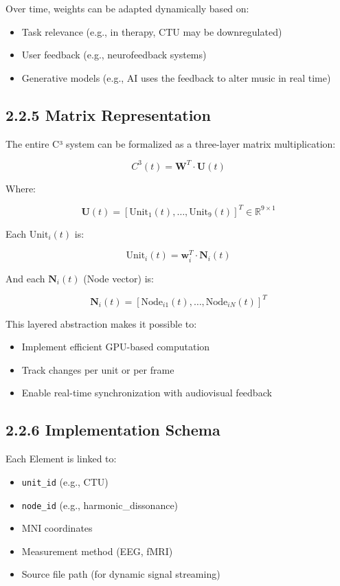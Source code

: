 \documentclass[10pt]{article}
\begin{document}
Over time, weights can be adapted dynamically based on:

\begin{itemize}
    \item Task relevance (e.g., in therapy, CTU may be downregulated)
    \item User feedback (e.g., neurofeedback systems)
    \item Generative models (e.g., AI uses the feedback to alter music in real time)
\end{itemize}

\subsection*{2.2.5 Matrix Representation}

The entire C³ system can be formalized as a three-layer matrix multiplication:

\[
C^3(t) = \mathbf{W}^T \cdot \mathbf{U}(t)
\]

Where:

\[
\mathbf{U}(t) = [\text{Unit}_1(t), \ldots, \text{Unit}_9(t)]^T \in \mathbb{R}^{9 \times 1}
\]

Each $\text{Unit}_i(t)$ is:

\[
\text{Unit}_i(t) = \mathbf{w}_i^T \cdot \mathbf{N}_i(t)
\]

And each $\mathbf{N}_i(t)$ (Node vector) is:

\[
\mathbf{N}_i(t) = [\text{Node}_{i1}(t), \ldots, \text{Node}_{iN}(t)]^T
\]

This layered abstraction makes it possible to:

\begin{itemize}
    \item Implement efficient GPU-based computation
    \item Track changes per unit or per frame
    \item Enable real-time synchronization with audiovisual feedback
\end{itemize}

\subsection*{2.2.6 Implementation Schema}

Each Element is linked to:

\begin{itemize}
    \item \texttt{unit\_id} (e.g., CTU)
    \item \texttt{node\_id} (e.g., harmonic\_dissonance)
    \item MNI coordinates
    \item Measurement method (EEG, fMRI)
    \item Source file path (for dynamic signal streaming)
\end{itemize}
\end{document}
